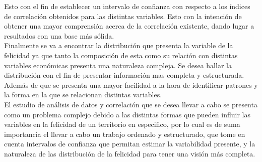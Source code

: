 Esto con el fin de establecer un intervalo de confianza con respecto a los índices de correlación obtenidos para las distintas variables. Esto con la intención de obtener una mayor comprensión acerca de la correlación existente, dando lugar a resultados con una base más sólida. \\

Finalmente se va a encontrar la distribución que presenta la variable de la felicidad ya que tanto la composición de esta como su relación con distintas variables económicas presenta una naturaleza compleja. Se desea hallar la distribución con el fin de presentar información mas completa y estructurada. Además de que se presenta una mayor facilidad a la hora de identificar patrones y la forma en la que se relacionan distintas variables.\\

El estudio de análisis de datos y correlación que se desea llevar a cabo se presenta como un problema complejo debido a las distintas formas que pueden influir las variables en la felicidad de un territorio en especifico, por lo cual es de suma importancia el llevar a cabo un trabajo ordenado y estructurado, que tome en cuenta intervalos de confianza que permitan estimar la variabilidad presente, y la naturaleza de las distribución de la felicidad para tener una visión más completa.